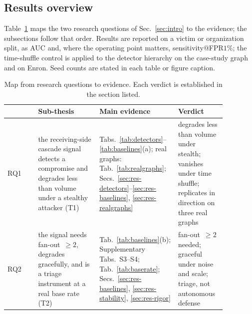 \subsection{Results overview}
\label{sec:res-overview}
Table~\ref{tab:roadmap} maps the two research questions of Sec.~\ref{sec:intro} to the evidence; the
subsections follow that order. Results are reported on a victim or organization split, as AUC and, where
the operating point matters, sensitivity@FPR$1\%$; the time-shuffle control is applied to the detector
hierarchy on the case-study graph and on Enron. Seed counts are stated in each table or figure caption.

\begin{table}[pos=htbp]\centering\small
\begin{tabular}{@{}l p{0.29\linewidth} p{0.36\linewidth} p{0.22\linewidth}@{}}
\toprule
& \textbf{Sub-thesis} & \textbf{Main evidence} & \textbf{Verdict} \\
\midrule
RQ1 & the receiving-side cascade signal detects a compromise and degrades less than volume under a stealthy attacker (T1) &
Tabs.~\ref{tab:detectors}--\ref{tab:baselines}(a); real graphs: Tab.~\ref{tab:realgraphs};
Secs.~\ref{sec:res-detectors}--\ref{sec:res-baselines}, \ref{sec:res-realgraphs} &
degrades less than volume under stealth; vanishes under time shuffle; replicates in direction on three real graphs \\
\addlinespace
RQ2 & the signal needs fan-out~$\ge2$, degrades gracefully, and is a triage instrument at a real base rate (T2) &
Tab.~\ref{tab:baselines}(b); Supplementary Tabs.~S3--S4; Tab.~\ref{tab:baserate};
Secs.~\ref{sec:res-baselines}, \ref{sec:res-stability}, \ref{sec:res-rigor} &
fan-out~$\ge2$ needed; graceful under noise and scale; triage, not autonomous defense \\
\bottomrule
\end{tabular}
\caption{Map from research questions to evidence. Each verdict is established in the section listed.}
\label{tab:roadmap}
\end{table}


